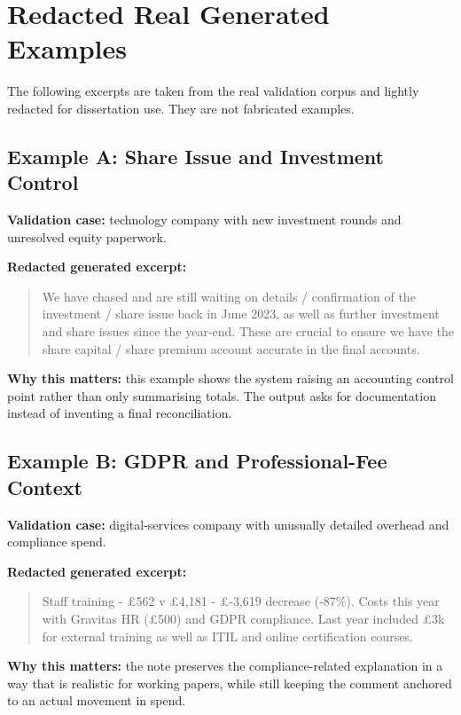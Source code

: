 \section{Redacted Real Generated Examples}
\label{app:sec:real_examples}

The following excerpts are taken from the real validation corpus and lightly redacted for dissertation use. They are not fabricated examples.

\subsection{Example A: Share Issue and Investment Control}

\textbf{Validation case:} technology company with new investment rounds and unresolved equity paperwork.

\textbf{Redacted generated excerpt:}
\begin{quote}
We have chased and are still waiting on details / confirmation of the investment / share issue back in June 2023, as well as further investment and share issues since the year-end. These are crucial to ensure we have the share capital / share premium account accurate in the final accounts.
\end{quote}

\textbf{Why this matters:} this example shows the system raising an accounting control point rather than only summarising totals. The output asks for documentation instead of inventing a final reconciliation.

\subsection{Example B: GDPR and Professional-Fee Context}

\textbf{Validation case:} digital-services company with unusually detailed overhead and compliance spend.

\textbf{Redacted generated excerpt:}
\begin{quote}
Staff training - \pounds562 v \pounds4,181 - \pounds-3,619 decrease (-87\%). Costs this year with Gravitas HR (\pounds500) and GDPR compliance. Last year included \pounds3k for external training as well as ITIL and online certification courses.
\end{quote}

\textbf{Why this matters:} the note preserves the compliance-related explanation in a way that is realistic for working papers, while still keeping the comment anchored to an actual movement in spend.

